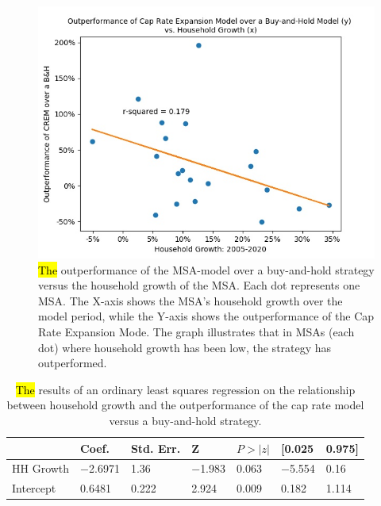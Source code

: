 \documentclass[jrfm,article,accept,oneauthor,pdftex]{Definitions/mdpi}
\begin{document}
\begin{figure}[H]
\includegraphics[scale=0.75]{Definitions/msa_scatter.jpg}
\caption{\hl{The} %
 outperformance of the MSA-model over a buy-and-hold strategy versus the household growth of the MSA. Each dot represents one MSA. The X-axis shows the MSA's household growth over the model period, while the Y-axis shows the outperformance of the Cap Rate Expansion Mode. The graph illustrates that in MSAs (each dot) where household growth has been low, the strategy has outperformed. \label{fig1}}
\end{figure}   %



\begin{table}[H]
\tabcolsep=0.358cm
  \caption{\hl{The} %
 results of an ordinary least squares regression on the relationship between household growth and the outperformance of the cap rate model versus a buy-and-hold strategy.}
    \begin{tabular}{lllllll}
    	\toprule
          & {\textbf{Coef.}} & {\textbf{Std. Err.}} & {\textbf{Z}} & {\boldmath${P>|z|}$} & {\textbf{[0.025}} & {\textbf{0.975]}} \\
          \midrule
    {HH Growth} & $-$2.6971 & 1.36  & $-$1.983 & 0.063 & $-$5.554 & 0.16 \\
    {Intercept} & 0.6481 & 0.222 & 2.924 & 0.009 & 0.182 & 1.114 \\
\bottomrule
    \end{tabular}%
  \label{tab:addlabel}%
\end{table}%
\end{document}
